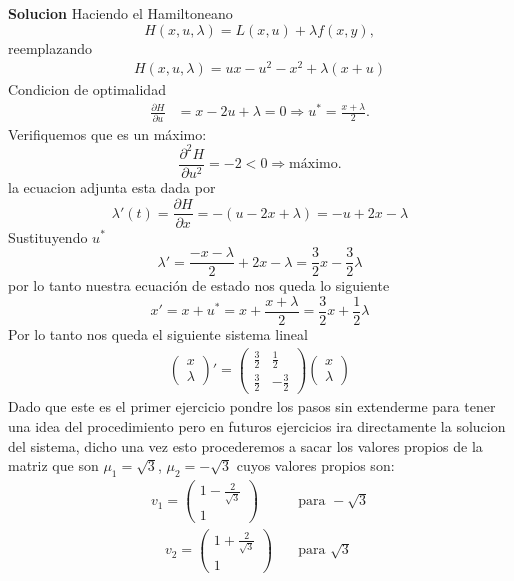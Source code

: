 \documentclass{uofa-eng-assignment}
\begin{document}
\begin{enumerate}
\textbf{Solucion}
Haciendo el Hamiltoneano
\[
H(x,u, \lambda)= L(x,u)+\lambda f(x,y),
\]
reemplazando
\begin{align*}
    H(x,u,\lambda)= ux-u^2-x^2+\lambda(x+u)
\end{align*}
Condicion de optimalidad
\begin{align*}
     \frac{\partial H}{\partial u}&=x-2u+\lambda=0 \Rightarrow u^*=\frac{x+\lambda}{2}.
\end{align*}
Verifiquemos que es un máximo:
\[
 \frac{\partial^2 H}{\partial u^2}=-2 < 0 \Rightarrow \text{máximo.}
\]
la ecuacion adjunta esta dada por
\[
\lambda '(t)= \frac{\partial H}{\partial x}= -(u-2x+\lambda)= -u+2x-\lambda
\]
Sustituyendo $u^*$
\[
\lambda' = \frac{-x-\lambda}{2}+2x-\lambda=\frac{3}{2}x -\frac{3}{2}\lambda
\]
por lo tanto nuestra ecuación de estado nos queda lo siguiente
\[
x'=x+u^*=x+\frac{x+\lambda}{2}=\frac{3}{2}x+\frac{1}{2}\lambda
\]
Por lo tanto nos queda el siguiente sistema lineal
\begin{align*}
\begin{pmatrix}
x \\
\lambda
\end{pmatrix}'
=
\begin{pmatrix}
\frac{3}{2} & \frac{1}{2} \\
\frac{3}{2} & -\frac{3}{2}
\end{pmatrix}
\begin{pmatrix}
x \\
\lambda
\end{pmatrix}
\end{align*}
Dado que este es el primer ejercicio pondre los pasos sin extenderme para tener una idea del procedimiento pero en futuros ejercicios ira directamente la solucion del sistema, dicho una vez esto procederemos a sacar los valores propios de la matriz que son $\mu_1 = \sqrt{3}$, $\mu_2 = -\sqrt{3}$ cuyos valores propios son:
\begin{align*}
  v_1=  \left(\begin{matrix}
1-\frac{2}{\sqrt{3}} \\1
\end{matrix} 
\right)   \quad                             &\text{para } -\sqrt{3}\\
\quad v_2=  \left(\begin{matrix}
1+\frac{2}{\sqrt{3}} \\1
\end{matrix}\right)                     \quad &\text{para }\sqrt{3}
\end{align*}

\end{enumerate}
\end{document}
